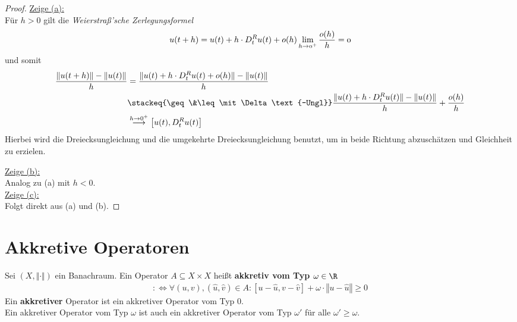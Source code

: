\begin{proof}
\underline{Zeige (a):}\\
Für $h>0$ gilt die \textit{Weierstraß'sche Zerlegungsformel}
\begin{align*}
u(t+h)=u(t)+h\cdot D_t^R u(t)+o(h)\mit\lim\limits_{h\to0^+}\frac{o(h)}{h}=0
\end{align*}
und somit
\begin{align*}
\frac{\Vert u(t+h)\Vert-\Vert u(t)\Vert}{h}
&=
\frac{\Vert u(t)+h\cdot D_t^R u(t)+ o(h)\Vert-\Vert u(t)\Vert}{h}\\
&\stackeq{\geq\&\leq\mit\Delta\text{-Ungl}}
\frac{\Vert u(t)+h\cdot D_t^R u(t)\Vert-\Vert u(t)\Vert}{h}+\frac{o(h)}{h}\\
&\stackrel{h\to0^+}{\longrightarrow} \left[ u(t), D_t^R u(t)\right]
\end{align*}
Hierbei wird die Dreiecksungleichung und die umgekehrte Dreiecksungleichung benutzt, um in beide Richtung abzuschätzen und Gleichheit zu erzielen.

\underline{Zeige (b):}\\
Analog zu (a) mit $h<0$.\\

\underline{Zeige (c):}\\
Folgt direkt aus (a) und (b).
\end{proof}

\section{Akkretive Operatoren}
\begin{definition}
Sei $(X,\Vert\cdot\Vert)$ ein Banachraum. Ein Operator $A\subseteq X\times X$ heißt \textbf{akkretiv vom Typ $\omega\in\R$}
\begin{align*}
:\Longleftrightarrow\forall (u,v),(\hat{u},\hat{v})\in A:\left[ u-\hat{u},v-\hat{v}\right]+\omega\cdot\left\Vert u-\hat{u}\right\Vert\geq0
\end{align*}
Ein \textbf{akkretiver} Operator  ist ein akkretiver Operator vom Typ $0$.\\
Ein akkretiver Operator vom Typ $\omega$ ist auch ein akkretiver Operator vom Typ $\omega'$ für alle $\omega'\geq\omega$.
\end{definition}

